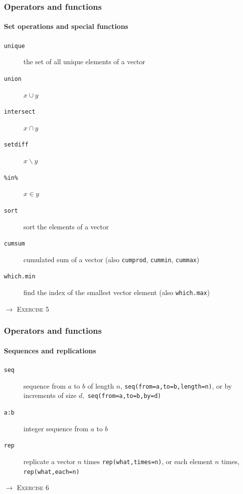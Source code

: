 \documentclass[title={Introduction to R}, author={Mutschler and Zaharieva}, inst={Institute for Econometrics and Empirical Economics}]{beamer}
\begin{document}
\begin{frame}
\frametitle{Operators and functions}
\framesubtitle{Set operations and special functions}
\begin{description}
\item[\texttt{unique}] the set of all unique elements of a vector
\item[\texttt{union}] $x\cup y$
\item[\texttt{intersect}] $x\cap y$
\item[\texttt{setdiff}] $x\backslash y$
\item[\texttt{\%in\%}] $x\in y$
\item[\texttt{sort}] sort the elements of a vector
\item[\texttt{cumsum}] cumulated sum of a vector \newline
(also \texttt{cumprod}, \texttt{cummin}, \texttt{cummax})
\item[\texttt{which.min}] find the index of the smallest vector element 
\newline
(also \texttt{which.max})
\end{description}\pause
$\longrightarrow $ \textsc{Exercise 5}
\end{frame}


\begin{frame}
\frametitle{Operators and functions}
\framesubtitle{Sequences and replications}
\begin{description}
\item[\texttt{seq}] sequence from $a$ to $b$ of length $n$, \newline
\texttt{seq(from=a,to=b,length=n)}, \newline
or by increments of size $d,$ \newline
\texttt{seq(from=a,to=b,by=d)}
\item[\texttt{a:b}] integer sequence from $a$ to $b$
\item[\texttt{rep}] replicate a vector $n$ times\newline
\texttt{rep(what,times=n)},\newline
or each element $n$ times,\newline
\texttt{rep(what,each=n)}
\end{description}\pause
$\longrightarrow $ \textsc{Exercise 6}
\end{frame}
\end{document}
